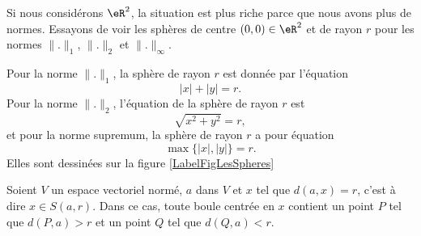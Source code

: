 \begin{example}
	Si nous considérons $\eR^2$, la situation est plus riche parce que nous avons plus de normes. Essayons de voir les sphères de centre $(0,0)\in\eR^2$ et de rayon $r$ pour les normes $\| . \|_1$, $\| . \|_2$ et $\| . \|_{\infty}$.

	Pour la norme $\| . \|_1$, la sphère de rayon $r$ est donnée par l'équation
	\begin{equation}
		| x |+| y |=r.
	\end{equation}
	Pour la norme $\| . \|_2$, l'équation de la sphère de rayon $r$ est
	\begin{equation}
		\sqrt{x^2+y^2}=r,
	\end{equation}
	et pour la norme supremum, la sphère de rayon $r$ a pour équation
	\begin{equation}
		\max\{ | x |,| y | \}=r.
	\end{equation}
	Elles sont dessinées sur la figure \ref{LabelFigLesSpheres}
\newcommand{\CaptionFigLesSpheres}{Les sphères de rayon $1$ pour les trois normes classiques.}

\end{example}

\newcommand{\CaptionFigBoulePtLoin}{Le point $P$ est un peu plus loin que $x$, en suivant la même droite.}


\begin{proposition}		\label{PropBoitPtLoin}
	Soient $V$ un espace vectoriel normé, $a$ dans $V$ et $x$ tel que $d(a,x)=r$, c'est à dire $x\in S(a,r)$. Dans ce cas, toute boule centrée en $x$ contient un point $P$ tel que $d(P,a)>r$ et un point $Q$ tel que $d(Q,a)<r$.
\end{proposition}

